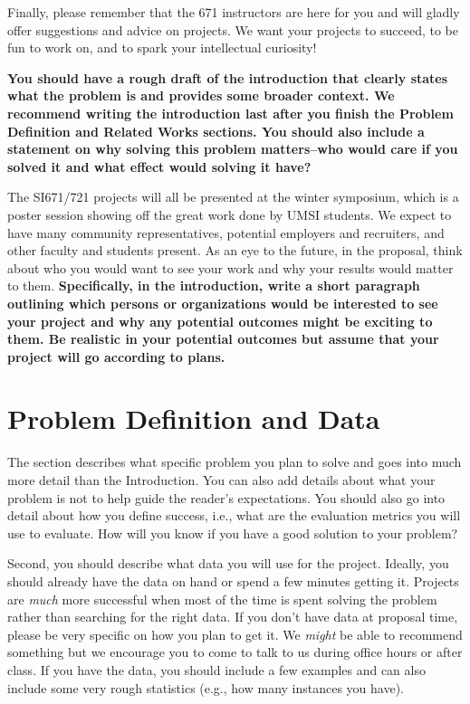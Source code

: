 \documentclass[11pt,a4paper]{article}
\begin{document}
Finally, please remember that the 671 instructors are here for you and will gladly offer suggestions and advice on projects.  We want your projects to succeed, to be fun to work on, and to spark your intellectual curiosity!  


\textbf{\color{red} You should have a rough draft of the introduction that clearly states what the problem is and provides some broader context.  We recommend writing the introduction last after you finish the Problem Definition and Related Works sections.  You should also include a statement on why solving this problem matters--who would care if you solved it and what effect would solving it have?}

The SI671/721 projects will all be presented at the winter symposium, which is a poster session showing off the great work done by UMSI students.  We expect to have many community representatives, potential employers and recruiters, and other faculty and students present.  As an eye to the future, in the proposal, think about who you would want to see your work and why your results would matter to them.  \textbf{\color{red} Specifically, in the introduction, write a short paragraph outlining which persons or organizations would be interested to see your project and why any potential outcomes might be exciting to them.  Be realistic in your potential outcomes but assume that your project will go according to plans. }

\section{Problem Definition and Data}
\label{sec:problem}

The section describes what specific problem you plan to solve and goes into much
more detail than the Introduction.  You can also add details about what your
problem is not to help guide the reader's expectations.  You should also go into detail
about how you define success, i.e., what are the evaluation metrics you will use to evaluate.  How will you know if you have a good solution to
your problem?

Second, you should describe what data you will use for the project.  Ideally, you should already have the data on hand or spend a few minutes getting it.  Projects are \textit{much} more successful when most of the time is spent solving the problem rather than searching for the right data.  If you don't have data at proposal time, please be very specific on how you plan to get it.  We \textit{might} be able to recommend something but we encourage you to come to talk to us during office hours or after class.  If you have the data, you should include a few examples and can also include some very rough statistics (e.g., how many instances you have).
\end{document}
